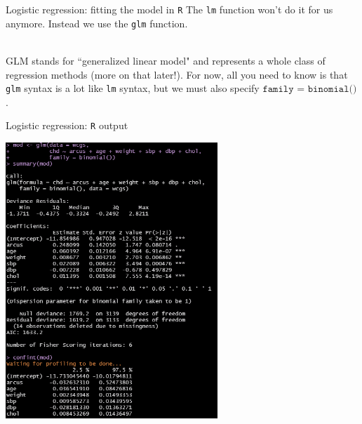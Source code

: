 \documentclass[10pt,t]{beamer}
\begin{document}
\begin{frame}{Logistic regression: fitting the model in \texttt{R}}
	The \texttt{lm} function won't do it for us anymore. Instead we use the \texttt{glm} function. 
	\\ ~\ 
	
	GLM stands for ``generalized linear model" and represents a whole class of regression methods (more on that later!). For now, all you need to know is that \texttt{glm} syntax is a lot like \texttt{lm} syntax, but we must also specify $\texttt{family = binomial()}$. 
\end{frame}

\begin{frame}{Logistic regression: \texttt{R} output}
	\vspace{-1cm}
		\begin{center}
		\includegraphics[width=0.6\textwidth]{./figs/multiple_logistic_regression_arcus}
	\end{center}
\end{frame}
\end{document}
